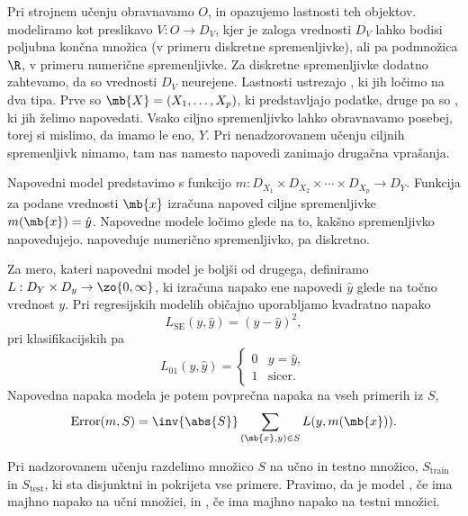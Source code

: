 Pri strojnem učenju obravnavamo  $O$, in
opazujemo lastnosti teh objektov.
 modeliramo kot preslikavo $V: O \to D_V$, kjer je zaloga
vrednosti $D_V$ lahko bodisi poljubna končna množica (v primeru diskretne
spremenljivke), ali pa podmnožica $\R$, v primeru numerične spremenljivke.
Za diskretne spremenljivke dodatno zahtevamo, da so vrednosti $D_V$ neurejene.
Lastnosti ustrezajo , ki jih ločimo na dva tipa.
Prve so  $\mb{X} = (X_1, \ldots, X_p)$, ki
predstavljajo podatke, druge pa so , ki jih želimo
napovedati.
Vsako ciljno spremenljivko lahko obravnavamo posebej, torej si mislimo, da imamo
le eno, $Y$.
Pri nenadzorovanem učenju ciljnih spremenljivk nimamo, tam nas namesto napovedi
zanimajo drugačna vprašanja.


Napovedni model predstavimo s funkcijo $m: D_{X_1} \times D_{X_2} \times \cdots
\times D_{X_p} \to D_Y$.
Funkcija za podane vrednosti $\mb{x}$ izračuna napoved ciljne spremenljivke
$m(\mb{x}) = \hat{y}$.
Napovedne modele ločimo glede na to, kakšno spremenljivko napovedujejo.
 napoveduje numerično spremenljivko,
 pa diskretno.

Za mero, kateri napovedni model je boljši od drugega, definiramo  $L: D_Y \times D_y \to \zo{0, \infty}$, ki izračuna napako ene napovedi
$\hat{y}$ glede na točno vrednost $y$.
Pri regresijskih modelih običajno uporabljamo kvadratno napako
\[
  L_{\text{SE}}(y, \hat{y}) = {(y - \hat{y})}^2,
\]
pri klasifikacijskih pa
\[
  L_{01}(y, \hat{y}) =
  \begin{cases}
	0 & y = \hat{y}, \\
	1 & \text{sicer}.
  \end{cases}
\]
Napovedna napaka modela je potem povprečna napaka na vseh primerih iz $S$,
\[
  \operatorname{Error}(m, S) = \inv{\abs{S}} \sum_{(\mb{x}, y) \in S} L(y,
  m(\mb{x})).
\]

Pri nadzorovanem učenju razdelimo množico $S$ na učno in testno množico,
$S_{\text{train}}$ in $S_{\text{test}}$, ki sta disjunktni in pokrijeta vse
primere.
Pravimo, da je model , če ima majhno napako na učni množici, in
, če ima majhno napako na testni množici.


